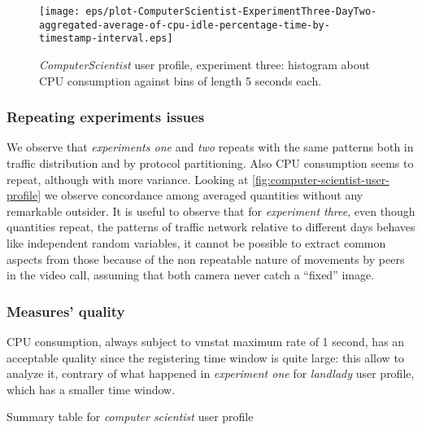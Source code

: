 \documentclass[10pt,a4paper]{article}
\begin{document}
    \begin{figure}
      \centering
      \texttt{[image: eps/plot-ComputerScientist-ExperimentThree-DayTwo-aggregated-average-of-cpu-idle-percentage-time-by-timestamp-interval.eps]}
      \caption{\emph{ComputerScientist} user profile, experiment
        three: histogram about CPU consumption against bins of length 5
        seconds each.}
      \label{fig:computer-scientist-user-profile-experiment-three-aggregate-cpu-idle-percentage}
    \end{figure}

    \subsubsection*{Repeating experiments issues}
    
    We observe that \emph{experiments one} and \emph{two} repeats with
    the same patterns both in traffic distribution and by protocol
    partitioning. Also CPU consumption seems to repeat, although with
    more variance. Looking at
    \autoref{fig:computer-scientist-user-profile} we observe
    concordance among averaged quantities without any remarkable
    outsider. It is useful to observe that for \emph{experiment
      three}, even though quantities repeat, the patterns of traffic
    network relative to different days behaves like independent random
    variables, it cannot be possible to extract common aspects from
    those because of the non repeatable nature of movements by peers
    in the video call, assuming that both camera never catch a
    ``fixed'' image.


    \subsubsection*{Measures' quality}
    CPU consumption, always subject to vmstat maximum rate of 1
    second, has an acceptable quality since the registering time
    window is quite large: this allow to analyze it, contrary of what
    happened in \emph{experiment one} for \emph{landlady} user
    profile, which has a smaller time window.

    \begin{table}
      \begin{adjustwidth}{-2cm}{}
            
      \end{adjustwidth}
      \caption{Summary table for \emph{computer scientist} user profile}
      \label{fig:computer-scientist-user-profile}
    \end{table}
\end{document}

